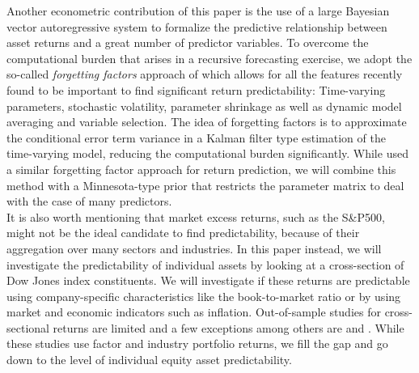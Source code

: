 \indent Another econometric contribution of this paper is the use of a large Bayesian vector autoregressive system to formalize the predictive relationship between asset returns and a great number of predictor variables. To overcome the computational burden that arises in a recursive forecasting exercise, we adopt the so-called \textit{forgetting factors} approach of \cite{koop2013} which allows for all the features recently found to be important to find significant return predictability: Time-varying parameters, stochastic volatility, parameter shrinkage as well as dynamic model averaging and variable selection. The idea of forgetting factors is to approximate the conditional error term variance in a Kalman filter type estimation of the time-varying model, reducing the computational burden significantly. While \cite{dangl2012} used a similar forgetting factor approach for return prediction, we will combine this method with a Minnesota-type prior that restricts the parameter matrix to deal with the case of many predictors.\\
%
\indent It is also worth mentioning that market excess returns, such as the S\&P500, might not be the ideal candidate to find predictability, because of their aggregation over many sectors and industries. In this paper instead, we will investigate the predictability of individual assets by looking at a cross-section of Dow Jones index constituents. We will investigate if these returns are predictable using company-specific characteristics like the book-to-market ratio or by using market and economic indicators such as inflation. Out-of-sample studies for cross-sectional returns are limited and a few exceptions among others are \cite{avramov2002} and \cite{rapach2015}. While these studies use factor and industry portfolio returns, we fill the gap and go down to the level of individual equity asset predictability.\\    
%

